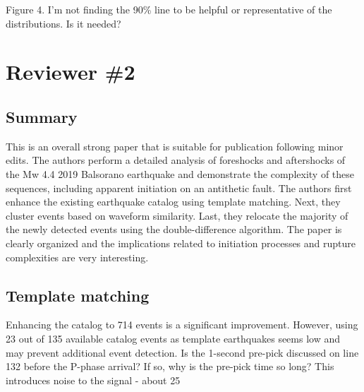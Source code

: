 \documentclass[10pt]{extarticle}
\begin{document}
\begin{ReviewerComment}{1}
\noindent 
Figure 4. I'm not finding the 90\% line to be helpful or representative of the distributions. Is it needed?

\end{ReviewerComment}


\begin{Answer}
 \WorkInProgressRevTask
\end{Answer}
%
%

\section*{Reviewer \#2}


\subsection*{Summary}

This is an overall strong paper that is suitable for publication following minor edits. The authors perform a detailed analysis of foreshocks and aftershocks of the Mw 4.4 2019 Balsorano earthquake and demonstrate the complexity of these sequences, including apparent initiation on an antithetic fault. The authors first enhance the existing earthquake catalog using template matching. Next, they cluster events based on waveform similarity. Last, they relocate the majority of the newly detected events using the double-difference algorithm. The paper is clearly organized and the implications related to initiation processes and rupture complexities are very interesting.  \\


\subsection*{Template matching}

\begin{ReviewerComment}{1}
\noindent 
Enhancing the catalog to 714 events is a significant improvement. However, using 23 out of 135 available catalog events as template earthquakes seems low and may prevent additional event detection. Is the 1-second pre-pick discussed on line 132 before the P-phase arrival? If so, why is the pre-pick time so long? This introduces noise to the signal - about 25%

\end{ReviewerComment}
\end{document}
